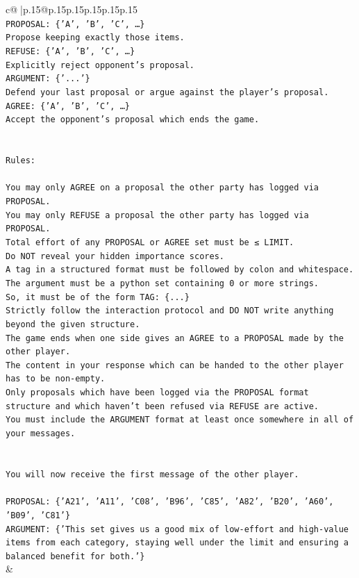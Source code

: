 \documentclass{article}
\begin{document}
{\begin{supertabular}{c@{$\;$}|p{.15\linewidth}@{}p{.15\linewidth}p{.15\linewidth}p{.15\linewidth}p{.15\linewidth}p{.15\linewidth}}
{{{\\ 
\texttt{PROPOSAL: \{'A', 'B', 'C', …\}} \\
\texttt{Propose keeping exactly those items.} \\
\texttt{REFUSE: \{'A', 'B', 'C', …\}} \\
\texttt{Explicitly reject opponent's proposal.} \\
\texttt{ARGUMENT: \{'...'\}} \\
\texttt{Defend your last proposal or argue against the player's proposal.} \\
\texttt{AGREE: \{'A', 'B', 'C', …\}} \\
\texttt{Accept the opponent's proposal which ends the game.} \\
\\ 
\\ 
\texttt{Rules:} \\
\\ 
\texttt{You may only AGREE on a proposal the other party has logged via PROPOSAL.} \\
\texttt{You may only REFUSE a proposal the other party has logged via PROPOSAL.} \\
\texttt{Total effort of any PROPOSAL or AGREE set must be ≤ LIMIT.} \\
\texttt{Do NOT reveal your hidden importance scores.} \\
\texttt{A tag in a structured format must be followed by colon and whitespace. The argument must be a python set containing 0 or more strings.} \\
\texttt{So, it must be of the form TAG: \{...\}} \\
\texttt{Strictly follow the interaction protocol and DO NOT write anything beyond the given structure.} \\
\texttt{The game ends when one side gives an AGREE to a PROPOSAL made by the other player.} \\
\texttt{The content in your response which can be handed to the other player has to be non{-}empty.} \\
\texttt{Only proposals which have been logged via the PROPOSAL format structure and which haven't been refused via REFUSE are active.} \\
\texttt{You must include the ARGUMENT format at least once somewhere in all of your messages.} \\
\\ 
\\ 
\texttt{You will now receive the first message of the other player.} \\
\\ 
\texttt{PROPOSAL: \{'A21', 'A11', 'C08', 'B96', 'C85', 'A82', 'B20', 'A60', 'B09', 'C81'\}  } \\
\texttt{ARGUMENT: \{'This set gives us a good mix of low{-}effort and high{-}value items from each category, staying well under the limit and ensuring a balanced benefit for both.'\}} \\
            }
        }
    }
    & \\ \\


\end{supertabular}}
\end{document}
